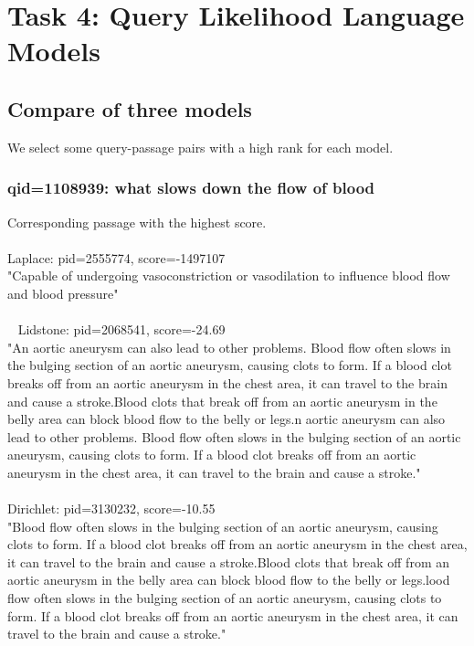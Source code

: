 \section{Task 4: Query Likelihood Language Models}
\subsection{Compare of three models}
We select some query-passage pairs with a high rank for each model.
\subsubsection{qid=1108939: what slows down the flow of blood}
Corresponding passage with the highest score.
\\\\
Laplace: pid=2555774, score=-1497107
\\
"Capable of undergoing vasoconstriction or vasodilation to influence blood flow and blood pressure"
\\\\ 
Lidstone: pid=2068541, score=-24.69
\\
"An aortic aneurysm can also lead to other problems. Blood flow often slows in the bulging section of an aortic aneurysm, causing clots to form. If a blood clot breaks off from an aortic aneurysm in the chest area, it can travel to the brain and cause a stroke.Blood clots that break off from an aortic aneurysm in the belly area can block blood flow to the belly or legs.n aortic aneurysm can also lead to other problems. Blood flow often slows in the bulging section of an aortic aneurysm, causing clots to form. If a blood clot breaks off from an aortic aneurysm in the chest area, it can travel to the brain and cause a stroke."
\\\\
Dirichlet: pid=3130232, score=-10.55
\\
"Blood flow often slows in the bulging section of an aortic aneurysm, causing clots to form. If a blood clot breaks off from an aortic aneurysm in the chest area, it can travel to the brain and cause a stroke.Blood clots that break off from an aortic aneurysm in the belly area can block blood flow to the belly or legs.lood flow often slows in the bulging section of an aortic aneurysm, causing clots to form. If a blood clot breaks off from an aortic aneurysm in the chest area, it can travel to the brain and cause a stroke."
\\\\
